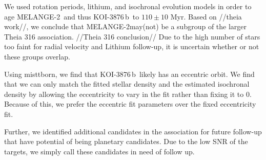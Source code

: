 \documentclass[twocolumn]{aastex631}
\newcommand{\planetname}{KOI-3876\,b}
\newcommand{\association}{MELANGE-2}
\begin{document}
We used rotation periods, lithium, and isochronal evolution models in order to age \association\, and thus \planetname\, to $110\pm10$ Myr. Based on //theia work//, we conclude that \association may(not) be a subgroup of the larger Theia 316 association. //Theia 316 conclusion// Due to the high number of stars too faint for radial velocity and Lithium follow-up, it is uncertain whether or not these groups overlap.

Using misttborn, we find that \planetname\ likely has an eccentric orbit. We find that we can only match the fitted stellar density and the estimated isochronal density by allowing the eccentricity to vary in the fit rather than fixing it to 0. Because of this, we prefer the eccentric fit parameters over the fixed eccentricity fit. 

Further, we identified additional candidates in the association for future follow-up that have potential of being planetary candidates. Due to the low SNR of the targets, we simply call these candidates in need of follow up. 
\end{document}

